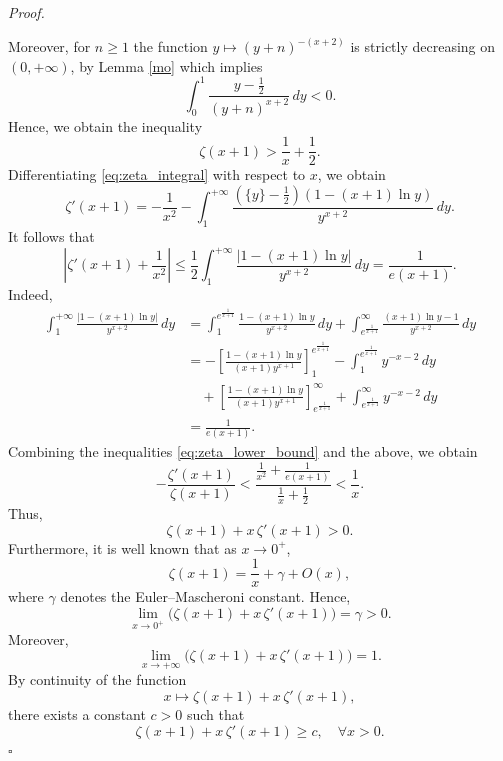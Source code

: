 \documentclass[10pt]{article}
\renewenvironment{proof}[1][Proof]{%
  \noindent\textit{#1. }%
}{\hfill$\square$\vspace{4pt}}
\begin{document}
\begin{proof}
Moreover, for $n\geq 1$ the function $y \mapsto (y+n)^{-(x+2)}$ is strictly decreasing on $(0, +\infty)$, by Lemma \ref{mo} which implies
\[
\int_0^1 \frac{y - \frac{1}{2}}{(y+n)^{x+2}} \, dy < 0.
\]
Hence, we obtain the inequality
\begin{equation} \label{eq:zeta_lower_bound}
\zeta(x + 1) > \frac{1}{x} + \frac{1}{2}.
\end{equation}
Differentiating \eqref{eq:zeta_integral} with respect to $x$, we obtain
\[
\zeta'(x + 1) = - \frac{1}{x^2} - \int_1^{+\infty} \frac{(\{y\} - \frac{1}{2}) \left(1 - (x + 1) \ln y \right)}{y^{x+2}} \, dy.
\]
It follows that
\[
\left| \zeta'(x + 1) + \frac{1}{x^2} \right|
\le \frac{1}{2} \int_1^{+\infty}
\frac{\lvert 1 - (x + 1)\ln y \rvert}{y^{x+2}} \, dy
= \frac{1}{e(x+1)}.
\]
Indeed,
\begin{align*}
\int_1^{+\infty} \frac{|1 - (x + 1) \ln y|}{y^{x+2}} \, dy
&= \int_1^{e^{\frac{1}{x+1}}}
\frac{1 - (x + 1) \ln y}{y^{x+2}} \, dy
+ \int_{e^{\frac{1}{x+1}}}^{\infty}
\frac{(x + 1) \ln y - 1}{y^{x+2}} \, dy \\
&= -\left[\frac{1 - (x+1)\ln y}{(x+1)y^{x+1}}\right]_1^{e^{\frac{1}{x+1}}}
- \int_1^{e^{\frac{1}{x+1}}} y^{-x-2} \, dy \\
&\quad
+ \left[\frac{1 - (x+1)\ln y}{(x+1)y^{x+1}}\right]_{e^{\frac{1}{x+1}}}^{\infty}
+ \int_{e^{\frac{1}{x+1}}}^{\infty} y^{-x-2} \, dy \\
&= \frac{1}{e(x+1)}.
\end{align*}
Combining the inequalities \eqref{eq:zeta_lower_bound} and the above, we obtain
\[
- \frac{\zeta'(x + 1)}{\zeta(x + 1)} < \frac{\frac{1}{x^2} + \frac{1}{e(x+1)}}{\frac{1}{x} + \frac{1}{2}} < \frac{1}{x}.
\]
Thus,
\[
\zeta(x + 1) + x \, \zeta'(x + 1) > 0.
\]
Furthermore, it is well known that as $x \to 0^+$,
\[
\zeta(x + 1) = \frac{1}{x} + \gamma + O(x),
\]
where $\gamma$ denotes the Euler–Mascheroni constant. Hence,
\[
\lim_{x \to 0^+} \big( \zeta(x + 1) + x \, \zeta'(x + 1) \big) = \gamma > 0.
\]
Moreover,
\[
\lim_{x \to +\infty} \big( \zeta(x + 1) + x \, \zeta'(x + 1) \big) = 1.
\]
By continuity of the function
\[
x \longmapsto \zeta(x + 1) + x \, \zeta'(x + 1),
\]
there exists a constant $c > 0$ such that
\[
\zeta(x + 1) + x \, \zeta'(x + 1) \ge c, \quad \forall x > 0.
\]
\end{proof}
\end{document}
